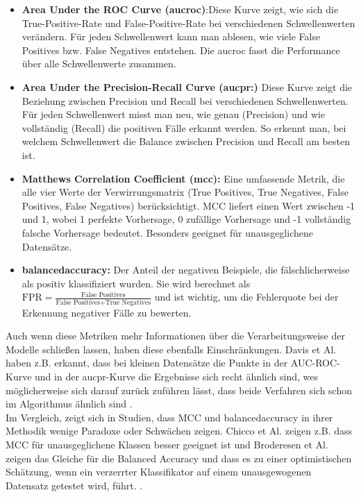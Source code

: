 \documentclass[a4paper,12pt]{article}
\begin{document}
	\begin{itemize}
		\item \textbf{Area Under the ROC Curve (\gls{aucroc})}:Diese Kurve zeigt, wie sich die True-Positive-Rate und False-Positive-Rate bei verschiedenen Schwellenwerten verändern. Für jeden Schwellenwert kann man ablesen, wie viele False Positives bzw. False Negatives entstehen. Die \gls{aucroc} fasst die Performance über alle Schwellenwerte zusammen.
		\item \textbf{Area Under the Precision-Recall Curve (\gls{aucpr}:)} Diese Kurve zeigt die Beziehung zwischen Precision und Recall bei verschiedenen Schwellenwerten. Für jeden Schwellenwert misst man neu, wie genau (Precision) und wie vollständig (Recall) die positiven Fälle erkannt werden. So erkennt man, bei welchem Schwellenwert die Balance zwischen Precision und Recall am besten ist.
		\item \textbf{Matthews Correlation Coefficient (\gls{mcc}):} Eine umfassende Metrik, die alle vier Werte der Verwirrungsmatrix (True Positives, True Negatives, False Positives, False Negatives) berücksichtigt. MCC liefert einen Wert zwischen -1 und 1, wobei 1 perfekte Vorhersage, 0 zufällige Vorhersage und -1 vollständig falsche Vorhersage bedeutet. Besonders geeignet für unausgeglichene Datensätze.
		\item \textbf{\gls{balancedaccuracy}:} Der Anteil der negativen Beispiele, die fälschlicherweise als positiv klassifiziert wurden. Sie wird berechnet als \(\text{FPR} = \frac{\text{False Positives}}{\text{False Positives} + \text{True Negatives}}\) und ist wichtig, um die Fehlerquote bei der Erkennung negativer Fälle zu bewerten.
	\end{itemize}
	Auch wenn diese Metriken  mehr Informationen über die Verarbeitungsweise der Modelle schließen lassen, haben diese ebenfalls Einschränkungen. Davis et Al. haben z.B. erkannt, dass bei kleinen Datensätze die Punkte in der AUC-ROC-Kurve und in der \gls{aucpr}-Kurve die Ergebnisse sich recht ähnlich sind, wes möglicherweise sich darauf zurück zuführen lässt, dass beide Verfahren sich schon im Algorithmus ähnlich sind \cite{davis2006relationship}.
	\\[0.5em]
	Im Vergleich, zeigt sich in Studien, dass MCC und \gls{balancedaccuracy} in ihrer Methodik wenige Paradoxe oder Schwächen zeigen. Chicco et Al. zeigen z.B. dass MCC für unausgeglichene Klassen besser geeignet ist und Broderesen et Al. zeigen das Gleiche für die Balanced Accuracy und dass es zu einer optimistischen Schätzung, wenn ein verzerrter Klassifikator auf einem unausgewogenen Datensatz getestet wird, führt. \cite{chicco2020advantages, brodersen2010balanced}.
\end{document}
